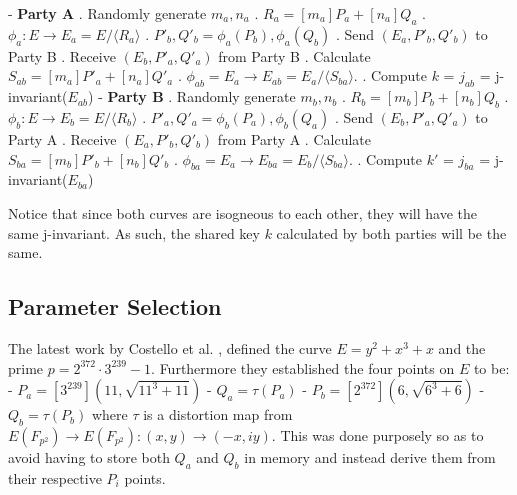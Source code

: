 \documentclass[10pt,twocolumn]{article} %
\begin{document}
- \textbf{Party A} 
. Randomly generate $ m_{a},n_{a}$
. $R_{a} = [m_{a}]P_{a}+[n_{a}]Q_{a}$
. $\phi_{a}: E \rightarrow E_{a} = E/\langle R_{a}\rangle$
. $P'_{b},Q'_{b}=\phi_{a}(P_{b}),\phi_{a}(Q_{b})$
. Send $(E_{a}, P'_{b}, Q'_{b})$ to Party B
. Receive $(E_b, P'_a, Q'_a)$ from Party B
. Calculate $S_{ab} = [m_a]P'_a+[n_a]Q'_a$ 
. $\phi_{ab}=E_{a}\rightarrow E_{ab} = E_{a}/ \langle S_{ba} \rangle $.
. Compute $k$ = $j_{ab}$ = j-invariant($E_{ab}$)
\newline
\newline
- \textbf{Party B}
. Randomly generate $ m_{b},n_{b}$
. $R_{b} = [m_{b}]P_{b}+[n_{b}]Q_{b}$
. $\phi_{b}: E \rightarrow E_{b} = E/\langle R_b\rangle$
. $P'_{a},Q'_{a}=\phi_{b}(P_{a}),\phi_{b}(Q_{a})$
. Send $(E_{b}, P'_{a}, Q'_{a})$ to Party A
. Receive $(E_a, P'_b, Q'_b)$ from Party A
. Calculate $S_{ba} = [m_b]P'_b+[n_b]Q'_b$ 
. $\phi_{ba}=E_{a}\rightarrow E_{ba} = E_{b}/ \langle S_{ba} \rangle $.
. Compute $k'$ = $j_{ba}$ = j-invariant($E_{ba}$)
\newline



\par Notice that since both curves are isogneous to each other, they will have the same j-invariant. As such, the shared key $k$ calculated by both parties will be the same.




\subsection{Parameter Selection}
\label{sec:params}
The latest work by Costello et al. \cite{costello2016}, defined the curve $E = y^2+x^3 +x$ and the prime $p = 2^{372}\cdot 3^{239}-1$. Furthermore they established the four points on $E$ to be: \\
- $P_{a} = [3^{239}](11,\sqrt{11^3+11})$ \newline
- $Q_a=\tau(P_a)$ \newline
- $P_b=[2^{372}](6,\sqrt{6^3+6})$ \newline
- $Q_b=\tau(P_b)$ \newline
where $\tau$ is a distortion map from $E(F_{p^2})\rightarrow E(F_{p^2}) : (x,y) \rightarrow (-x,iy)$. This was done purposely so as to avoid having to store both $Q_a$ and $Q_b$ in memory and instead derive them from their respective $P_i$ points.
\end{document}

